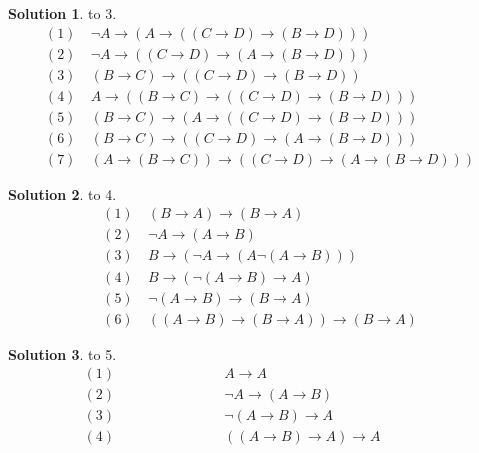 \documentclass[12pt, a4paper]{ctexart} %
\theoremstyle{plain}
\theoremstyle{definition}
\newtheorem*{solution}{Solution}
\begin{document}
\begin{solution} to 3.
    \begin{align*}
        (1) \ &\neg A \to (A \to \left(\left(C \to D\right) \to \left(B \to D\right)\right)) \tag{thm 6}\\
        (2) \ &\neg A \to \left(\left(C \to D\right) \to \left(A \to \left( B \to D\right)\right)\right) \tag{thm 3, rmp}\\
        (3) \ &\left(B \to C\right) \to \left(\left( C \to D\right) \to \left(B \to D\right) \right) \tag{thm 5} \\
        (4) \ &A \to \left(\left(B \to C\right) \to \left(\left(C \to D\right) \to \left(B \to D\right)\right)\right) \tag{thm 1, rmp}\\
        (5) \ &\left( B \to C \right) \to \left(A \to \left(\left(C \to D\right) \to \left(B \to D\right)\right)\right)\tag{thm 3, rmp}\\
        (6) \ &\left(B \to C\right) \to \left(\left(C \to D\right) \to \left(A \to \left(B \to D\right)\right)\right) \tag{thm 8, thm 3}\\
        (7) \ &\left(A \to \left(B \to C\right) \right) \to \left(\left(C \to D\right) \to \left(A \to \left(B \to D\right)\right)\right) \tag{(2), (6)thm 18}
    \end{align*}
\end{solution}
\begin{solution} to 4.
    \begin{align*}
        (1)\ & \left(B \to A\right) \to \left(B \to A  \right) \tag{thm 1}\\
        (2)\ & \neg A \to \left(A \to B     \right) \tag{thm 6}\\
        (3)\ & B \to \left(\neg A \to \left(A \neg \left(A \to B\right) \right)\right) \tag{thm 1, rmp}\\
        (4)\ & B \to \left(\neg \left( A \to B  \right) \to A  \right) \tag{thm 14, thm 8}\\
        (5)\ & \neg \left(A \to B  \right) \to \left( B \to A  \right) \tag{thm 3, rmp}\\
        (6)\ & \left(\left(A \to B\right) \to \left(B \to A\right) \right) \to \left(B \to A\right) \tag{thm 18, (1)(6)}
    \end{align*}
\end{solution}
\begin{solution} to 5. 
    \begin{align*}
        (1)\qquad \qquad \quad \quad \quad&A \to A \tag{thm 1}\qquad \qquad \qquad \\
        (2)\qquad \qquad \quad \quad \quad&\neg A \to \left( A \to B\right) \tag{thm 6} \qquad \qquad \qquad \\
        (3)\qquad \qquad \quad \quad \quad&\neg \left(A \to B\right) \to A \tag{thm 14, rmp} \qquad \qquad \qquad \\
        (4)\qquad \qquad \quad \quad \quad&\left( \left(A \to B\right) \to A    \right)\to A \tag{thm 18, (1) (3)}\qquad \qquad
    \end{align*}
\end{solution}
\end{document}
